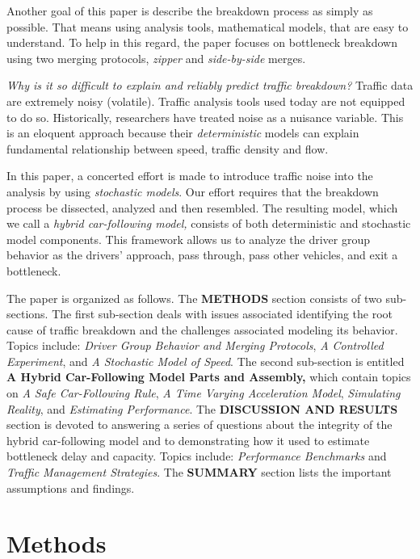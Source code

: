 \documentclass[Proceedings]{ascelike}
\begin{document}
Another goal of this paper is describe the breakdown process as simply as possible. That means using analysis tools, mathematical models, that are easy to understand. To help in this regard, the paper focuses on bottleneck breakdown using two merging protocols, \emph{zipper} and \emph{side-by-side} merges.

\emph{Why is it so difficult to explain and reliably predict traffic breakdown?} Traffic data are extremely noisy (volatile). Traffic analysis tools used today are not equipped to do so. Historically, researchers have treated noise as a nuisance variable. This is an eloquent  approach because their \emph{deterministic} models can explain fundamental relationship between speed, traffic density and flow. 

In this paper, a concerted effort is made to introduce traffic noise into the analysis by using \emph{stochastic models}. Our effort requires that the breakdown process be dissected, analyzed and then resembled. The resulting model, which we call a \emph{hybrid car-following model,} consists of both deterministic and stochastic model components. This framework allows us to analyze the driver group behavior as the drivers' approach, pass through, pass other vehicles, and exit a bottleneck.

The paper is organized as follows. The \textbf{METHODS} section consists of two sub-sections. The first sub-section deals with issues associated identifying the root cause  of traffic breakdown and the challenges associated modeling its behavior. Topics include:  \emph{Driver Group Behavior and Merging Protocols}, \emph{A Controlled Experiment}, and \emph{A Stochastic Model of Speed}. The second sub-section is entitled \textbf{A Hybrid Car-Following Model Parts and Assembly,} which contain topics on \emph{A Safe Car-Following Rule}, \emph{A Time Varying Acceleration Model}, \emph{Simulating Reality}, and \emph{Estimating Performance}. The \textbf{DISCUSSION AND RESULTS} section is devoted to answering a series of questions about  the integrity of the hybrid car-following model and to demonstrating how  it used to estimate bottleneck delay and capacity. Topics include: \emph{Performance Benchmarks} and \emph{Traffic Management Strategies}. The \textbf{SUMMARY} section lists the  important assumptions and findings.


\section{Methods}
\end{document}
